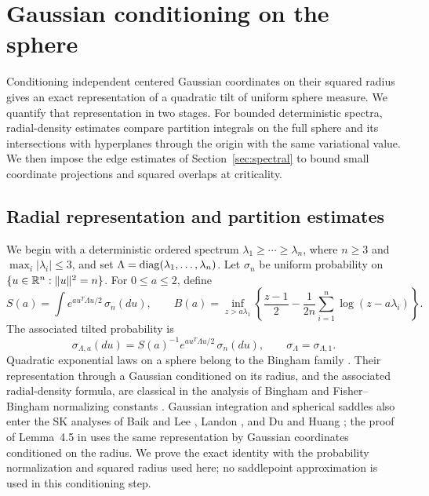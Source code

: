\section{Gaussian conditioning on the sphere}
\label{sec:spherical}

Conditioning independent centered Gaussian coordinates on their squared radius
gives an exact representation of a quadratic tilt of uniform sphere
measure. We quantify that representation in two stages. For bounded
deterministic spectra, radial-density estimates compare partition
integrals on the full sphere and its intersections with hyperplanes
through the origin with the same variational value. We then impose the
edge estimates of Section~\ref{sec:spectral} to bound small coordinate
projections and squared overlaps at criticality.

\subsection{Radial representation and partition estimates}

We begin with a deterministic ordered spectrum
$\lambda_1\ge\cdots\ge\lambda_n$, where $n\ge3$ and
$\max_i|\lambda_i|\le3$, and set
$\Lambda=\operatorname{diag}(\lambda_1,\ldots,\lambda_n)$.
Let $\sigma_n$ be uniform probability on
$\{u\in\mathbb R^n:\|u\|^2=n\}$.  For $0\le a\le2$, define
\begin{equation}
\label{eq:spherical-definitions}
 S(a)=\int e^{a u^T\Lambda u/2}\,\sigma_n(du),
 \qquad
 B(a)=\inf_{z>a\lambda_1}
 \left\{\frac{z-1}{2}
       -\frac1{2n}\sum_{i=1}^n\log(z-a\lambda_i)\right\}.
\end{equation}
The associated tilted probability is
\[
 \sigma_{\Lambda,a}(du)
 =S(a)^{-1}e^{a u^T\Lambda u/2}\,\sigma_n(du),
 \qquad
 \sigma_\Lambda=\sigma_{\Lambda,1}.
\]
Quadratic exponential laws on a sphere belong to the Bingham family
\cite{bingham1974}. Their representation through a Gaussian conditioned
on its radius, and the associated radial-density formula, are classical
in the analysis of Bingham and Fisher--Bingham normalizing constants
\cite{kumeWood2005,kumePrestonWood2013}. Gaussian integration and spherical
saddles also enter the SK analyses of Baik and Lee \cite{baikLee2016},
Landon \cite{landon2022}, and Du and Huang
\cite{duHuang2026FreeEnergy,duHuang2026Overlap}; the proof of Lemma~4.5 in
\cite{duHuang2026Overlap} uses the same representation by Gaussian
coordinates conditioned on the radius. We prove the exact identity
with the probability normalization and squared radius used here; no
saddlepoint approximation is used in this conditioning step.

